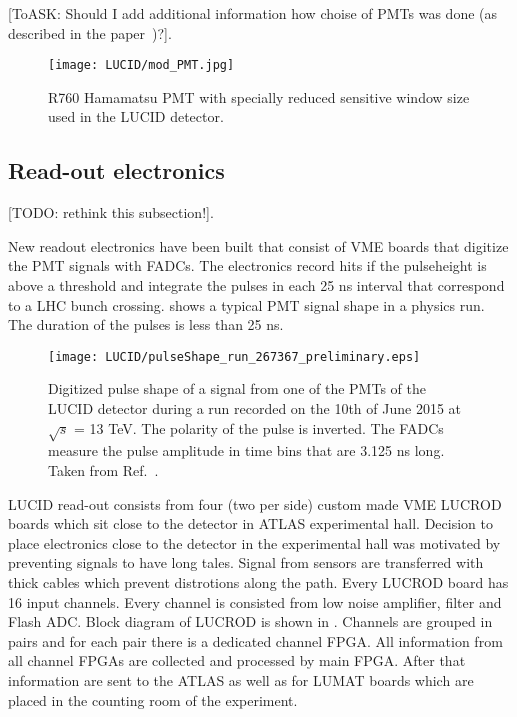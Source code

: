 [ToASK: Should I add additional information how choise of PMTs was done (as described in the paper~\cite{Alberghi:2016tad})?].

\begin{figure}
\centering
\texttt{[image: LUCID/mod\_PMT.jpg]}
\caption{R760 Hamamatsu PMT with specially reduced sensitive window size used in the LUCID detector.}
\label{fig:modPMT}
\end{figure}


\subsection{Read-out electronics}
\label{subsec:LUCIDElectronics}

[TODO: rethink this subsection!].

New readout electronics have been built that consist of VME boards that digitize the PMT signals with FADCs. 
The electronics record hits if the pulseheight is above a threshold and integrate the pulses in each 25 ns 
interval that correspond to a LHC bunch crossing.  shows a typical PMT signal shape in 
a physics run. The duration of the pulses is less than 25 ns.

\begin{figure}
\centering
\texttt{[image: LUCID/pulseShape\_run\_267367\_preliminary.eps]}
\caption{Digitized pulse shape of a signal from one of the PMTs of the LUCID detector during a run recorded on 
the 10th of June 2015 at $\sqrt{s}$ = 13 TeV. The polarity of the pulse is inverted. The FADCs measure the 
pulse amplitude in time bins that are 3.125 ns long. Taken from Ref.~\cite{publicPlots}.}
\label{fig:pulseShape}
\end{figure}

LUCID read-out consists from four (two per side) custom made VME LUCROD boards which sit close to the detector in ATLAS experimental hall.
Decision to place electronics close to the detector in the experimental hall was motivated by preventing signals to have long tales.
Signal from sensors are transferred with thick cables which prevent distrotions along the path.
Every LUCROD board has 16 input channels. Every channel is consisted from low noise amplifier, filter and Flash ADC.
Block diagram of LUCROD is shown in .
Channels are grouped in pairs and for each pair there is a dedicated channel FPGA.
All information from all channel FPGAs are collected and processed by main FPGA.
After that information are sent to the ATLAS as well as for LUMAT boards which are placed in the counting room of the experiment.

